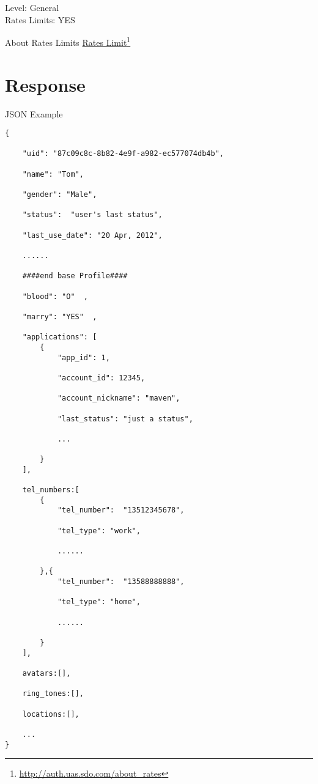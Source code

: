 Level: General\\
Rates Limits: YES 

About Rates Limits \href{http://auth.uas.sdo.com/about_rates}{Rates Limit}\footnote{\href{http://auth.uas.sdo.com/about_rates}{http:/\slash auth.uas.sdo.com\slash about\_rates}}

\section{Response}
\label{response}

JSON Example 

\begin{verbatim}
{

    "uid": "87c09c8c-8b82-4e9f-a982-ec577074db4b",

    "name": "Tom",

    "gender": "Male",

    "status":  "user's last status",

    "last_use_date": "20 Apr, 2012",

    ......

    ####end base Profile####

    "blood": "O"  ,

    "marry": "YES"  ,  

    "applications": [
        {
            "app_id": 1,  

            "account_id": 12345,  

            "account_nickname": "maven",  

            "last_status": "just a status",  

            ...   

        }
    ],  

    tel_numbers:[
        {
            "tel_number":  "13512345678",

            "tel_type": "work",

            ......

        },{
            "tel_number":  "13588888888",

            "tel_type": "home",

            ......

        }
    ],

    avatars:[],

    ring_tones:[],

    locations:[],

    ...
}
\end{verbatim}


